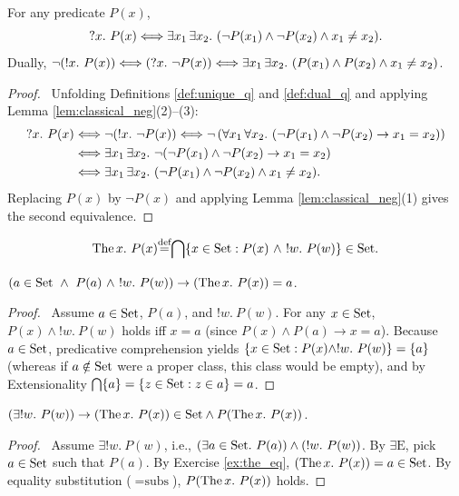 \documentclass[10pt,a4paper]{article}
\renewcommand{\myprf}{\begin{proof}}
\renewcommand{\myqed}{\end{proof}}
\begin{document}
\begin{lemma}
For any predicate $P(x)$,
$$?x.\ P(x) \LRA \exists x_1\, \exists x_2.\ (\neg P(x_1) \land \neg P(x_2) \land x_1 \neq x_2).$$
Dually, $\neg (!x.\ P(x)) \Longleftrightarrow (?x.\ \neg P(x)) \Longleftrightarrow \exists x_1\, \exists x_2.\ (P(x_1) \land P(x_2) \land x_1 \neq x_2)$.
\end{lemma}
\myprf\ Unfolding Definitions \ref{def:unique_q} and \ref{def:dual_q} and applying Lemma \ref{lem:classical_neg}(2)--(3):
\begin{align*}
?x.\ P(x) &\Longleftrightarrow \neg (!x.\ \neg P(x)) \Longleftrightarrow \neg \left(\forall x_1\, \forall x_2.\ (\neg P(x_1) \land \neg P(x_2) \to x_1 = x_2)\right) \\
&\Longleftrightarrow \exists x_1\, \exists x_2.\ \neg (\neg P(x_1) \land \neg P(x_2) \to x_1 = x_2) \\
&\Longleftrightarrow \exists x_1\, \exists x_2.\ (\neg P(x_1) \land \neg P(x_2) \land x_1 \neq x_2).
\end{align*}
Replacing $P(x)$ by $\neg P(x)$ and applying Lemma \ref{lem:classical_neg}(1) gives the second equivalence. \myqed

\begin{definition}\label{def:the_binder}
$$\The x.\ P(x) \eqdef \inter \{x \in \Set : P(x)\ \land\ !w.\ P(w)\} \in \Set.$$
\end{definition}

\begin{exercise}\label{ex:the_eq}
$(a \in {\textrm{Set}}\ \land\ P(a)\ \land\ !w.\ P(w)) \to ({\textrm{The\,}} x.\ P(x))=a$.
\end{exercise}
\myprf\ Assume $a \in {\textrm{Set}}$, $P(a)$, and $!w.\ P(w)$. For any $x \in {\textrm{Set}}$, $P(x) \land !w.\ P(w)$ holds iff $x = a$ (since $P(x) \land P(a) \to x=a$). Because $a \in {\textrm{Set}}$, predicative comprehension yields $\{x \in {\textrm{Set}} : P(x) \land !w.\ P(w)\} = \{a\}$ (whereas if $a \notin {\textrm{Set}}$ were a proper class, this class would be empty), and by Extensionality ${\bigcap} \{a\} = \{z \in {\textrm{Set}} : z \in a\} = a$. \myqed

\begin{exercise}\label{ex:the_prop}
$(\exists !w.\ P(w)) \to ({\textrm{The\,}} x.\ P(x)) \in {\textrm{Set}} \land P({\textrm{The\,}} x.\ P(x))$.
\end{exercise}
\myprf\ Assume $\exists !w.\ P(w)$, i.e., $(\exists a \in \Set.\ P(a)) \land (!w.\ P(w))$. By $\exists\textrm{E}$, pick $a \in {\textrm{Set}}$ such that $P(a)$. By Exercise \ref{ex:the_eq}, $({\textrm{The\,}} x.\ P(x)) = a \in {\textrm{Set}}$. By equality substitution ($=\textrm{subs}$), $P({\textrm{The\,}} x.\ P(x))$ holds. \myqed
\end{document}
